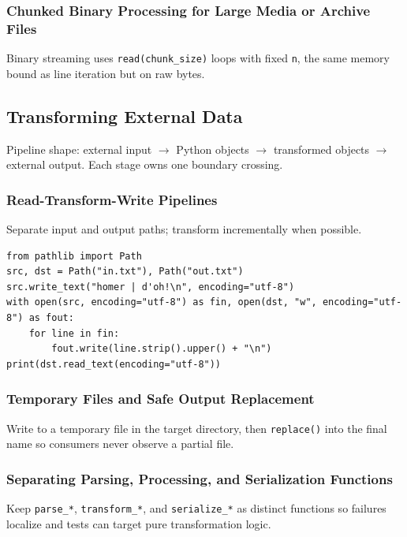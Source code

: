 \documentclass[a4paper,twoside]{report}
\begin{document}
\subsubsection{Chunked Binary Processing for Large Media or Archive Files}

Binary streaming uses \texttt{read(chunk\_size)} loops with fixed \texttt{n}, the same memory bound as line iteration but on raw bytes.


\subsection{Transforming External Data}

Pipeline shape: external input $\rightarrow$ Python objects $\rightarrow$ transformed objects $\rightarrow$ external output. Each stage owns one boundary crossing.

\subsubsection{Read-Transform-Write Pipelines}

Separate input and output paths; transform incrementally when possible.

\begin{verbatim}
from pathlib import Path
src, dst = Path("in.txt"), Path("out.txt")
src.write_text("homer | d'oh!\n", encoding="utf-8")
with open(src, encoding="utf-8") as fin, open(dst, "w", encoding="utf-8") as fout:
    for line in fin:
        fout.write(line.strip().upper() + "\n")
print(dst.read_text(encoding="utf-8"))
\end{verbatim}

\subsubsection{Temporary Files and Safe Output Replacement}

Write to a temporary file in the target directory, then \texttt{replace()} into the final name so consumers never observe a partial file.

\subsubsection{Separating Parsing, Processing, and Serialization Functions}

Keep \texttt{parse\_*}, \texttt{transform\_*}, and \texttt{serialize\_*} as distinct functions so failures localize and tests can target pure transformation logic.



\listoffigures


\end{document}
